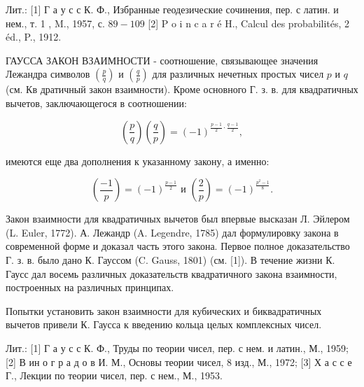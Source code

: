 \documentclass[10pt]{article}
\begin{document}
Лит.: [1] Г а у с с К. Ф., Избранные геодезические сочинения, пер. с латин. и нем., т. 1 , M., 1957, с. $89-109$ [2] P o i n c a r é H., Calcul des probabilités, 2 éd., P., 1912.



ГАУССА ЗАКОН ВЗАИМНОСТИ - соотношение, связывающее значения Лежандра символов $\left(\frac{p}{q}\right)$ и $\left(\frac{q}{p}\right)$ для различных нечетных простых чисел $p$ и $q$ (см. Кв дратичный закон взаимности). Кроме основного Г. з. в. для квадратичных вычетов, заключающегося в соотношении:



\[

\left(\frac{p}{q}\right)\left(\frac{q}{p}\right)=(-1)^{\frac{p-1}{2} \cdot \frac{q-1}{2}},

\]



имеются еще два дополнения к указанному закону, а именно:



\[

\left(\frac{-1}{p}\right)=(-1)^{\frac{p-1}{2}} \text { и }\left(\frac{2}{p}\right)=(-1)^{\frac{p^{2}-1}{8}} .

\]



Закон взаимности для квадратичных вычетов был впервые высказан Л. Эйлером (L. Euler, 1772). А. Лежандр (A. Legendre, 1785) дал формулировку закона в современной форме и доказал часть этого закона. Первое полное доказательство Г. з. в. было дано К. Гауссом (C. Gauss, 1801) (см. [1]). В течение жизни К. Гаусс дал восемь различных доказательств квадратичного закона взаимности, построенных на различных принципах.



Попытки установить закон взаимности для кубических и биквадратичных вычетов привели К. Гаусса к введению кольца целых комплексных чисел.



Лит.: [1] Г а у с с К. Ф., Труды по теории чисел, пер. с нем. и латин., М., 1959; [2] В ин о г р а д о в И. М., Основы теории чисел, 8 изд., М., 1972; [3] Х а с с е Г., Лекции по теории чисел, пер. с нем., М., 1953.
\end{document}
